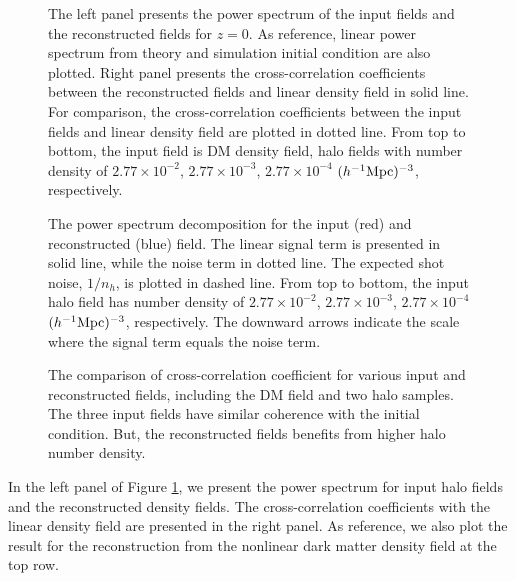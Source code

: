 \documentclass[iop]{emulateapj}
\newcommand{\mpch}{h^{-1} {\rm Mpc}}
\begin{document}
{%
\begin{figure*}
\epsfxsize=8.5cm
\epsfxsize=8.5cm
\caption{The left panel presents the power spectrum of the input fields and the reconstructed fields for $z=0$.
As reference, linear power spectrum from theory and simulation initial condition are also plotted.
Right panel presents the cross-correlation coefficients between the reconstructed fields and linear density field in solid line.
For comparison, the cross-correlation coefficients between the input fields and linear density field are plotted in dotted line.
From top to bottom, the input field is DM density field, halo fields with number density of $2.77\times 10^{-2}$, $2.77\times 10^{-3}$, $2.77\times 10^{-4}$ $(\mpch)^{-3}$, respectively.}
\label{fig:powercc}
\end{figure*}

\begin{figure}
\epsfxsize=8.5cm
\caption{The power spectrum decomposition for the input (red) and reconstructed (blue) field.
The linear signal term is presented in solid line, while the noise term in dotted line.
The expected shot noise, $1/n_h$, is plotted in dashed line.
From top to bottom, the input halo field has number density of $2.77\times 10^{-2}$, $2.77\times 10^{-3}$, $2.77\times 10^{-4}$ $(\mpch)^{-3}$, respectively.
The downward arrows indicate the scale where the signal term equals the noise term.}
\label{fig:decom}
\end{figure}

\begin{figure}
\epsfxsize=8.5cm
\caption{The comparison of cross-correlation coefficient for various input and reconstructed fields, including
the DM field and two halo samples.
The three input fields have similar coherence with the initial condition.
But, the reconstructed fields benefits from higher halo number density.}
\label{fig:ccnh}
\end{figure}

In the left panel of Figure \ref{fig:powercc}, we present the power spectrum for input halo fields and the reconstructed density fields.
The cross-correlation coefficients with the linear density field are presented in the right panel.
As reference, we also plot the result for the reconstruction from the nonlinear dark matter density field at the top row.

}
\end{document}
